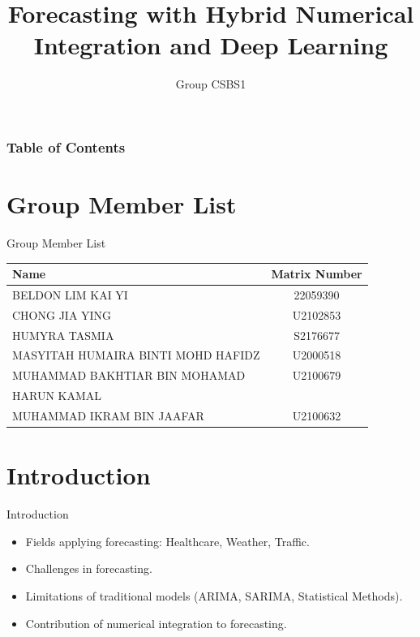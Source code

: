 \documentclass[10pt]{beamer}
\title[Forecasting Case Study]{Forecasting with Hybrid Numerical Integration and Deep Learning}
\subtitle{Group CSBS1}
\institute[WID3015 Numerical Analysis]{Supervisor: Dr. Suzan J. Obaiys}
\date[Universiti Malaya]
\begin{document}
\begin{frame}
    \titlepage
\end{frame}

\begin{frame}
    \frametitle{Table of Contents}
    \tableofcontents
\end{frame}

\section{Group Member List}
\begin{frame}{Group Member List}
    \begin{table}
    \begin{center}
    \small
        \begin{tabular}{|l|c|}
            \hline
            \textbf{Name} & \textbf{Matrix Number} \\ \hline
            BELDON LIM KAI YI  & 22059390  \\ \hline
            CHONG JIA YING  & U2102853  \\ \hline
            HUMYRA TASMIA  & S2176677  \\ \hline
            MASYITAH HUMAIRA BINTI MOHD HAFIDZ  & U2000518  \\ \hline
            MUHAMMAD BAKHTIAR BIN MOHAMAD  & U2100679 \\
            HARUN KAMAL  &  \\ \hline
            MUHAMMAD IKRAM BIN JAAFAR  & U2100632  \\ \hline
        \end{tabular}
    \end{center}
    \end{table}
\end{frame}

\section{Introduction}
\begin{frame}{Introduction}
    \begin{itemize}
        \item Fields applying forecasting: Healthcare, Weather, Traffic.
        \item Challenges in forecasting.
        \item Limitations of traditional models (ARIMA, SARIMA, Statistical Methods).
        \item Contribution of numerical integration to forecasting.
    \end{itemize}
\end{frame}
\end{document}
